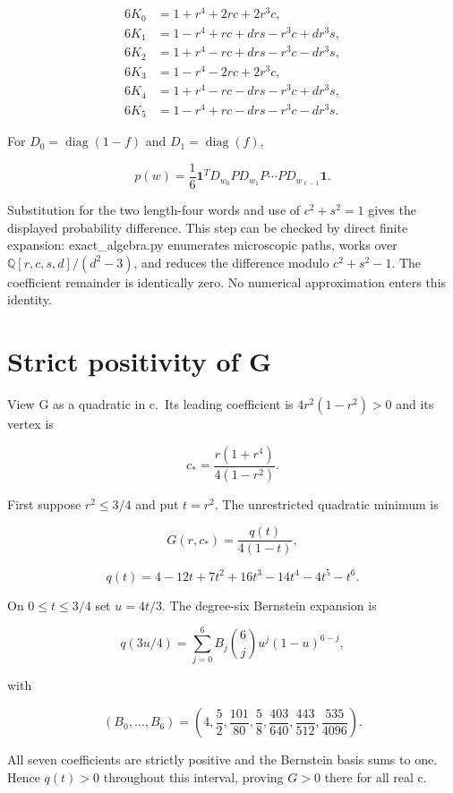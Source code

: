 \documentclass[11pt,a4paper]{article}
\begin{document}
\[
\begin{aligned}
6K_0&=1+r^4+2rc+2r^3c,\\
6K_1&=1-r^4+rc+drs-r^3c+dr^3s,\\
6K_2&=1+r^4-rc+drs-r^3c-dr^3s,\\
6K_3&=1-r^4-2rc+2r^3c,\\
6K_4&=1+r^4-rc-drs-r^3c+dr^3s,\\
6K_5&=1-r^4+rc-drs-r^3c-dr^3s.
\end{aligned}
\]

For \(D_0=\operatorname{diag}(1-f)\) and \(D_1=\operatorname{diag}(f)\),

\[p(w)=\frac16\mathbf1^T D_{w_0}P D_{w_1}P\cdots
 P D_{w_{\ell-1}}\mathbf1.\]

Substitution for the two length-four words and use of \(c^2+s^2=1\)
gives the displayed probability difference. This step can be checked by
direct finite expansion: exact\_algebra.py enumerates microscopic paths,
works over \(\mathbb{Q}[r,c,s,d]/(d^2-3)\), and reduces the difference
modulo \(c^2+s^2-1\). The coefficient remainder is identically zero. No
numerical approximation enters this identity.

\hypertarget{strict-positivity-of-g}{%
\section{Strict positivity of G}\label{strict-positivity-of-g}}

View G as a quadratic in c.~Its leading coefficient is \(4r^2(1-r^2)>0\)
and its vertex is

\[c_* = \frac{r(1+r^4)}{4(1-r^2)}.\]

First suppose \(r^2\le3/4\) and put \(t=r^2\). The unrestricted
quadratic minimum is

\[G(r,c_*)=\frac{q(t)}{4(1-t)},\]

\[q(t)=4-12t+7t^2+16t^3-14t^4-4t^5-t^6.\]

On \(0\le t\le3/4\) set \(u=4t/3\). The degree-six Bernstein expansion
is

\[q(3u/4)=\sum_{j=0}^{6} B_j {6\choose j}u^j(1-u)^{6-j},\]

with

\[ (B_0,\ldots,B_6)=
\left(4,\frac52,\frac{101}{80},\frac58,
\frac{403}{640},\frac{443}{512},\frac{535}{4096}\right).\]

All seven coefficients are strictly positive and the Bernstein basis
sums to one. Hence \(q(t)>0\) throughout this interval, proving \(G>0\)
there for all real c.
\end{document}
